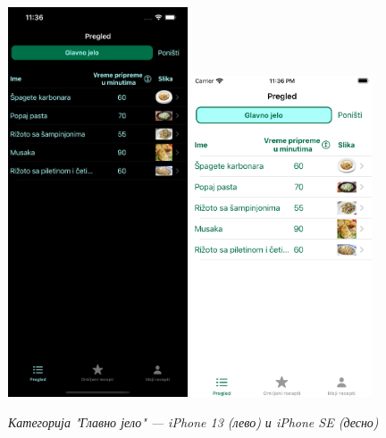 \documentclass[12pt,oneside]{memoir}
\begin{document}
\begin{figure} [H]
    \centering
    \captionsetup{justification=centering}
    \includegraphics[width=0.475\textwidth]{images/simulators/view images/dark - choosen category.png}
    \hfill
    \includegraphics[width=0.475\textwidth]{images/simulators/view images/light - choosen category.png}
    \caption{\textit{Категорија "Главно јело" --- iPhone 13 (лево) и iPhone SE (десно)}}
    \label{slika:изабрана_категорија_1}
\end{figure}
\end{document}
